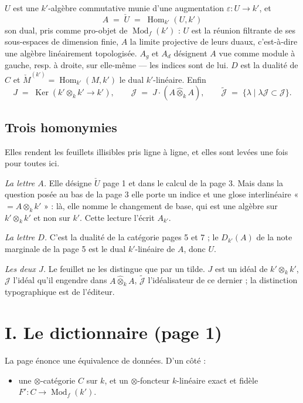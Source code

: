 \documentclass[11pt,a4paper]{article}
\begin{document}
$U$ est une $k'$-algèbre commutative munie d'une augmentation $\varepsilon : U
\to k'$, et
\[
A \;=\; \check{U} \;=\; \operatorname{Hom}_{k'}(U, k')
\]
son dual, pris comme pro-objet de $\operatorname{Mod}_{f}(k')$ : $U$ est la
réunion filtrante de ses sous-espaces de dimension finie, $A$ la limite
projective de leurs duaux, c'est-à-dire une algèbre linéairement topologisée.
$A_{g}$ et $A_{d}$ désignent $A$ vue comme module à gauche, resp. à droite, sur
elle-même — les indices sont de lui. $D$ est la dualité de $C$ et
$\check{M}^{(k')} = \operatorname{Hom}_{k'}(M, k')$ le dual $k'$-linéaire.
Enfin
\[
J \;=\; \operatorname{Ker}(k' \otimes_{k} k' \to k'),
\qquad
\mathcal{J} \;=\; J\cdot(A \mathbin{\hat{\otimes}}_{k} A),
\qquad
\widetilde{\mathcal{J}} \;=\; \{\lambda \mid \lambda\mathcal{J} \subset
\mathcal{J}\}.
\]

\subsection*{Trois homonymies}

Elles rendent les feuillets illisibles pris ligne à ligne, et elles sont
levées une fois pour toutes ici.

\emph{La lettre $A$.} Elle désigne $\check{U}$ page 1 et dans le calcul de la
page 3. Mais dans la question posée au bas de la page 3 elle porte un indice et
une glose interlinéaire « $= A \otimes_{k} k'$ » : là, elle nomme le changement
de base, qui est une algèbre sur $k' \otimes_{k} k'$ et non sur $k'$. Cette
lecture l'écrit $A_{k'}$.

\emph{La lettre $D$.} C'est la dualité de la catégorie pages 5 et 7 ; le
$D_{k'}(A)$ de la note marginale de la page 5 est le dual $k'$-linéaire de $A$,
donc $U$.

\emph{Les deux $J$.} Le feuillet ne les distingue que par un tilde. $J$ est un
idéal de $k' \otimes_{k} k'$, $\mathcal{J}$ l'idéal qu'il engendre dans
$A \mathbin{\hat{\otimes}}_{k} A$, $\widetilde{\mathcal{J}}$ l'idéalisateur de
ce dernier ; la distinction typographique est de l'éditeur.

\section*{I. Le dictionnaire (page 1)}

La page énonce une équivalence de données. D'un côté :

\begin{itemize}
\item une $\otimes$-catégorie $C$ sur $k$, et un $\otimes$-foncteur
$k$-linéaire exact et fidèle $F' : C \to \operatorname{Mod}_{f}(k')$.
\end{itemize}
\end{document}
